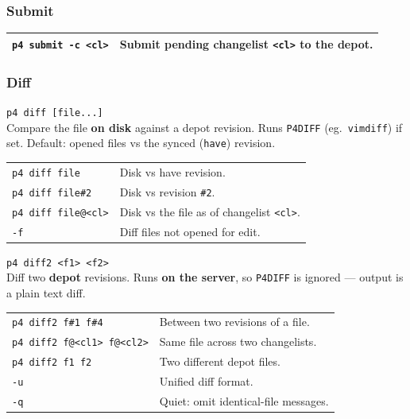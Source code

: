 \subsubsection*{Submit}

\begin{tabularx}{\linewidth}{lX}
    \texttt{p4 submit -c <cl>} & Submit pending changelist
                                    \texttt{<cl>} to the depot.\\
\hline
\end{tabularx}


\subsubsection*{Diff}

\texttt{p4 diff [file...]}\\
Compare the file \textbf{on disk} against a depot revision. Runs
\texttt{P4DIFF} (eg.\ \texttt{vimdiff}) if set. Default: opened
files vs the synced (\texttt{have}) revision.

\begin{tabularx}{\linewidth}{lX}
    \texttt{p4 diff file}      & Disk vs have revision.\\
    \texttt{p4 diff file\#2}   & Disk vs revision \texttt{\#2}.\\
    \texttt{p4 diff file@<cl>} & Disk vs the file as of changelist
                                   \texttt{<cl>}.\\
    \texttt{-f} & Diff files not opened for edit.\\
\hline
\end{tabularx}

\texttt{p4 diff2 <f1> <f2>}\\
Diff two \textbf{depot} revisions. Runs \textbf{on the server}, so
\texttt{P4DIFF} is ignored --- output is a plain text diff.

\begin{tabularx}{\linewidth}{lX}
    \texttt{p4 diff2 f\#1 f\#4} & Between two revisions of a
                                    file.\\
    \texttt{p4 diff2 f@<cl1> f@<cl2>}
                                & Same file across two
                                    changelists.\\
    \texttt{p4 diff2 f1 f2}     & Two different depot files.\\
    \texttt{-u} & Unified diff format.\\
    \texttt{-q} & Quiet: omit identical-file messages.\\
\hline
\end{tabularx}

